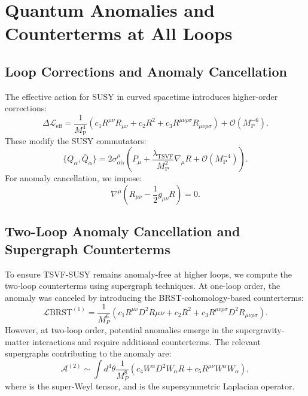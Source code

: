 \documentclass[12pt, onecolumn]{article}
\theoremstyle{definition}
\newcommand{\tsvf}{\lambda_{\mathrm{TSVF}}}
\newcommand{\Mp}{M_{\mathrm{P}}}
\numberwithin{equation}{section}
\begin{document}
\section{Quantum Anomalies and Counterterms at All Loops}
\subsection{Loop Corrections and Anomaly Cancellation}
The effective action for SUSY in curved spacetime introduces higher-order corrections:
\begin{equation}
\Delta \mathcal{L}_{\text{eff}} = \frac{1}{\Mp^4} \left(c_1 R^{\mu\nu} R_{\mu\nu} + c_2 R^2 + c_3 R^{\mu\nu\rho\sigma} R_{\mu\nu\rho\sigma}\right) + \mathcal{O}(\Mp^{-6}).
\end{equation}
These modify the SUSY commutators:
\begin{equation}
\{Q_\alpha, \bar{Q}_{\dot{\alpha}}\} = 2 \sigma^\mu_{\alpha\dot{\alpha}} \left( P_\mu + \frac{\tsvf}{\Mp^2} \nabla_\mu R + \mathcal{O}(\Mp^{-4}) \right).
\end{equation}
For anomaly cancellation, we impose:
\begin{equation}
\nabla^\mu \left(R_{\mu\nu} - \frac{1}{2} g_{\mu\nu} R \right) = 0.
\end{equation}

\subsection{Two-Loop Anomaly Cancellation and Supergraph Counterterms}
\label{subsec:two-loop-anomaly}

To ensure TSVF-SUSY remains anomaly-free at higher loops, we compute the two-loop counterterms using supergraph techniques. At one-loop order, the anomaly was canceled by introducing the BRST-cohomology-based counterterms:
\begin{equation}
\mathcal{L}{\text{BRST}}^{(1)} = \frac{1}{M_P^6} \left( c_1 R^{\mu\nu} D^2 R{\mu\nu} + c_2 R^2 + c_3 R^{\mu\nu\rho\sigma} D^2 R_{\mu\nu\rho\sigma} \right).
\label{eq:one-loop-counterterm}
\end{equation}
However, at two-loop order, potential anomalies emerge in the supergravity-matter interactions and require additional counterterms. The relevant supergraphs contributing to the anomaly are:
\begin{equation}
\mathcal{A}^{(2)} \sim \int d^4\theta \frac{1}{M_P^8} \left( c_4 W^{\alpha} D^2 W_{\alpha} R + c_5 R^{\mu\nu} W^{\alpha} W_{\alpha} \right),
\label{eq:two-loop-anomaly}
\end{equation}
where  is the super-Weyl tensor, and  is the supersymmetric Laplacian operator.
\end{document}
